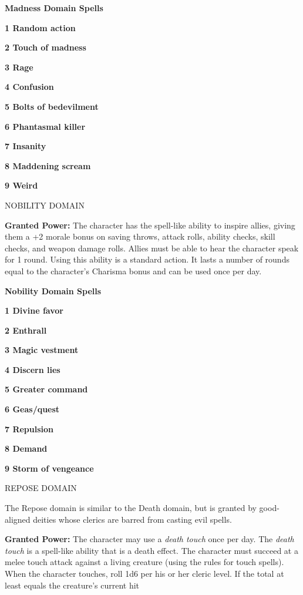 \documentclass{article}
\begin{document}
\textbf{Madness Domain Spells}

\textbf{1 Random action}

\textbf{2 Touch of madness}

\textbf{3 Rage}

\textbf{4 Confusion}

\textbf{5 Bolts of bedevilment}

\textbf{6 Phantasmal killer}

\textbf{7 Insanity}

\textbf{8 Maddening scream}

\textbf{9 Weird}

\vspace{12pt}
NOBILITY DOMAIN

\textbf{Granted Power:} The character has the spell-like ability to inspire allies, 
giving them a +2 morale bonus on saving throws, attack rolls, ability checks, skill 
checks, and weapon damage rolls. Allies must be able to hear the character speak 
for 1 round. Using this ability is a standard action. It lasts a number of rounds 
equal to the character's Charisma bonus and can be used once per day.

\textbf{Nobility Domain Spells}

\textbf{1 Divine favor}

\textbf{2 Enthrall}

\textbf{3 Magic vestment}

\textbf{4 Discern lies}

\textbf{5 Greater command}

\textbf{6 Geas/quest}

\textbf{7 Repulsion}

\textbf{8 Demand}

\textbf{9 Storm of vengeance}

\vspace{12pt}
REPOSE DOMAIN

The Repose domain is similar to the Death domain,\textit{ }but is granted by good-aligned 
deities whose clerics are barred from casting evil spells.

\textbf{Granted Power:} The character may use a \textit{death touch }once per day. 
The \textit{death touch }is a spell-like ability that is a death effect. The character 
must succeed at a melee touch attack against a living creature (using the rules 
for touch spells). When the character touches, roll 1d6 per his or her cleric level. 
If the total at least equals the creature's current hit
\end{document}
